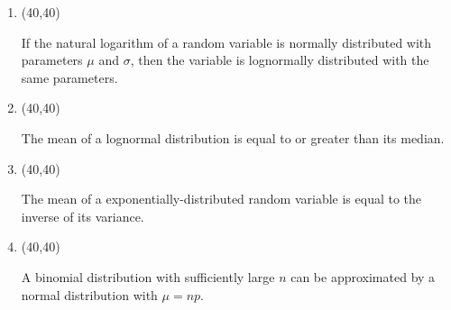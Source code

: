 \documentclass[11pt,twoside]{article}
\numberwithin{equation}{section}
\newcommand{\?}{\stackrel{?}{=}}
\newcommand{\gr}{\color{green!40!black}}
\begin{document}
\begin{enumerate}[\bf (i)]



\item \hfill
  \begin{minipage}{.1\linewidth}
    \framebox(40,40){\gr }
  \end{minipage}\quad
  \begin{minipage}{.85\linewidth}
    If the natural logarithm of a random variable is normally distributed with parameters $\mu$ and $\sigma$, then the
    variable is lognormally distributed with the same parameters.
   \end{minipage}
  
  \smallskip

  \item \hfill
    \begin{minipage}{.1\linewidth}
      \framebox(40,40){\gr  }
    \end{minipage}\quad
    \begin{minipage}{.85\linewidth}
      The mean of a lognormal distribution is equal to or greater than its median.
    \end{minipage}

    \smallskip

  \item \hfill
  \begin{minipage}{.1\linewidth}
    \framebox(40,40){\gr  }
  \end{minipage}\quad
  \begin{minipage}{.85\linewidth}
    The mean of a exponentially-distributed random variable is equal to the inverse of its variance.
   \end{minipage}

  \smallskip
  
\item \hfill
  \begin{minipage}{.1\linewidth}
    \framebox(40,40){\gr  }
  \end{minipage}\quad
  \begin{minipage}{.85\linewidth}
    A binomial distribution with sufficiently large $n$ can be approximated by a normal distribution with $\mu = np$.
  \end{minipage}


\end{enumerate}
\end{document}
